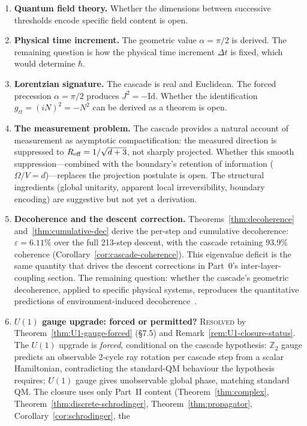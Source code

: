 \documentclass[12pt,a4paper]{article}
\begin{document}
\begin{enumerate}
\item \textbf{Quantum field theory.} Whether the dimensions between successive thresholds
encode specific field content is open.
\item \textbf{Physical time increment.} The geometric value $\alpha=\pi/2$ is derived. The
remaining question is how the physical time increment $\Delta t$ is fixed, which would
determine $\hbar$.
\item \textbf{Lorentzian signature.} The cascade is real and Euclidean. The forced precession
$\alpha=\pi/2$ produces $J^2=-\mathrm{Id}$. Whether the identification $g_{tt}=(iN)^2=-N^2$
can be derived as a theorem is open.
\item \textbf{The measurement problem.} The cascade provides a natural account of measurement
as asymptotic compactification: the measured direction is suppressed to $R_{\rm eff}=
1/\sqrt{d+3}$, not sharply projected. Whether this smooth suppression---combined with the
boundary's retention of information ($\Omega/V=d$)---replaces the projection postulate is
open. The structural ingredients (global unitarity, apparent local irreversibility, boundary
encoding) are suggestive but not yet a derivation.
\item \textbf{Decoherence and the descent correction.}
Theorems~\ref{thm:decoherence} and~\ref{thm:cumulative-dec} derive the per-step and
cumulative decoherence: $\varepsilon = 6.11\%$ over the full 213-step descent, with the
cascade retaining $93.9\%$ coherence (Corollary~\ref{cor:cascade-coherence}). This
eigenvalue deficit is the same quantity that drives the descent corrections in Part~0's
inter-layer-coupling section. The remaining question: whether the cascade's geometric decoherence, applied to
specific physical systems, reproduces the quantitative predictions of environment-induced
decoherence~\cite{zurek}.
\item \textbf{$U(1)$ gauge upgrade: forced or permitted?}\label{oq:U1-gauge-upgrade}
\textsc{Resolved} by Theorem~\ref{thm:U1-gauge-forced} (\S7.5) and
Remark~\ref{rem:U1-closure-status}. The $U(1)$ upgrade is \emph{forced},
conditional on the cascade hypothesis: $\mathbb{Z}_2$ gauge predicts an
observable 2-cycle ray rotation per cascade step from a scalar
Hamiltonian, contradicting the standard-QM behaviour the hypothesis
requires; $U(1)$ gauge gives unobservable global phase, matching
standard QM. The closure uses only Part~II content
(Theorem~\ref{thm:complex}, Theorem~\ref{thm:discrete-schrodinger},
Theorem~\ref{thm:propagator}, Corollary~\ref{cor:schrodinger}, the

\end{enumerate}
\end{document}
